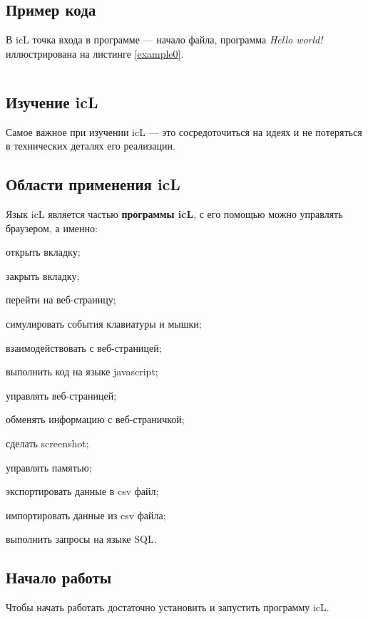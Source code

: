 \subsection{Пример кода}

В icL точка входа в программе — начало файла, программа \textit{Hello world!} иллюстрирована на листинге \ref{example0}.

\begin{sourcecode}
	\label{example0}
    \inputminted[linenos]{icl}{../sources/helloworld.icL}
\end{sourcecode}

\subsection{Изучение icL}

Самое важное при изучении icL — это сосредоточиться на идеях и не потеряться в технических деталях его реализации.

\subsection{Области применения icL}

Язык icL является частью \textbf{программы icL}, с его помощью можно управлять браузером, а именно:
\begin{icItems}
\item
	открыть вкладку;
\item
	закрыть вкладку;
\item
	перейти на веб-страницу;
\item
	симулировать события клавиатуры и мышки;
\item
	взаимодействовать с веб-страницей;
\item
	выполнить код на языке javascript;
\item
	управлять веб-страницей;
\item
	обменять информацию с веб-страничкой;
\item
	сделать screenshot;
\item
	управлять памятью;
\item
	экспортировать данные в csv файл;
\item
	импортировать данные из csv файла;
\item
	выполнить запросы на языке SQL.
\end{icItems}

\subsection{Начало работы}

Чтобы начать работать достаточно установить и запустить программу icL.
